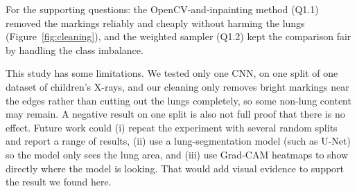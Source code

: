 \documentclass[10pt,twocolumn]{article}
\begin{document}
For the supporting questions: the OpenCV-and-inpainting method (Q1.1) removed the
markings reliably and cheaply without harming the lungs
(Figure~\ref{fig:cleaning}), and the weighted sampler (Q1.2) kept the comparison
fair by handling the class imbalance.

This study has some limitations. We tested only one CNN, on one split of one
dataset of children's X-rays, and our cleaning only removes bright markings near
the edges rather than cutting out the lungs completely, so some non-lung content
may remain. A negative result on one split is also not full proof that there is no
effect. Future work could (i) repeat the experiment with several random splits and
report a range of results, (ii) use a lung-segmentation model (such as U-Net) so
the model only sees the lung area, and (iii) use Grad-CAM heatmaps to show
directly where the model is looking. That would add visual evidence to support the
result we found here.
\end{document}
